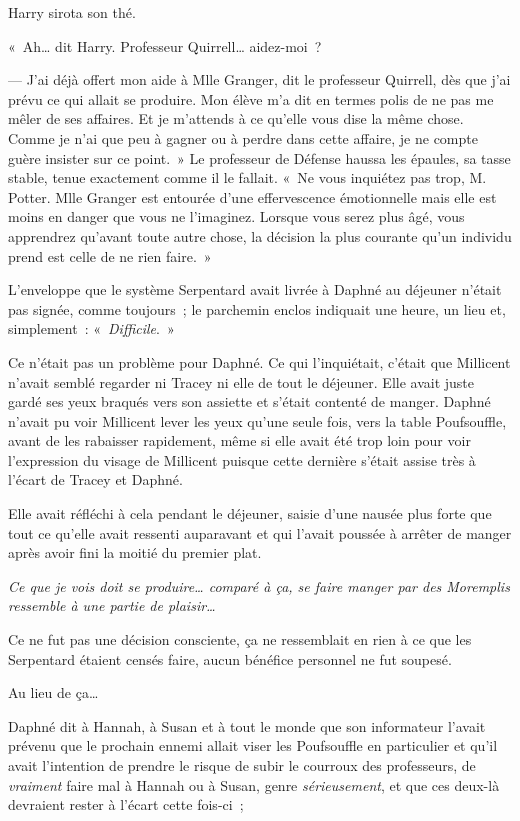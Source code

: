 Harry sirota son thé.

«~Ah… dit Harry. Professeur Quirrell… aidez-moi~?

--- J'ai déjà offert mon aide à Mlle Granger, dit le professeur Quirrell, dès que j'ai prévu ce qui allait se produire. Mon élève m'a dit en termes polis de ne pas me mêler de ses affaires. Et je m'attends à ce qu'elle vous dise la même chose. Comme je n'ai que peu à gagner ou à perdre dans cette affaire, je ne compte guère insister sur ce point.~» Le professeur de Défense haussa les épaules, sa tasse stable, tenue exactement comme il le fallait. «~Ne vous inquiétez pas trop, M. Potter. Mlle Granger est entourée d'une effervescence émotionnelle mais elle est moins en danger que vous ne l'imaginez. Lorsque vous serez plus âgé, vous apprendrez qu'avant toute autre chose, la décision la plus courante qu'un individu prend est celle de ne rien faire.~»

\later

L'enveloppe que le système Serpentard avait livrée à Daphné au déjeuner n'était pas signée, comme toujours~; le parchemin enclos indiquait une heure, un lieu et, simplement~: «~\emph{Difficile}.~»

Ce n'était pas un problème pour Daphné. Ce qui l'inquiétait, c'était que Millicent n'avait semblé regarder ni Tracey ni elle de tout le déjeuner. Elle avait juste gardé ses yeux braqués vers son assiette et s'était contenté de manger. Daphné n'avait pu voir Millicent lever les yeux qu'une seule fois, vers la table Poufsouffle, avant de les rabaisser rapidement, même si elle avait été trop loin pour voir l'expression du visage de Millicent puisque cette dernière s'était assise très à l'écart de Tracey et Daphné.

Elle avait réfléchi à cela pendant le déjeuner, saisie d'une nausée plus forte que tout ce qu'elle avait ressenti auparavant et qui l'avait poussée à arrêter de manger après avoir fini la moitié du premier plat.

\emph{Ce que je vois doit se produire… comparé à ça, se faire manger par des Moremplis ressemble à une partie de plaisir…}

Ce ne fut pas une décision consciente, ça ne ressemblait en rien à ce que les Serpentard étaient censés faire, aucun bénéfice personnel ne fut soupesé.

Au lieu de ça…

Daphné dit à Hannah, à Susan et à tout le monde que son informateur l'avait prévenu que le prochain ennemi allait viser les Poufsouffle en particulier et qu'il avait l'intention de prendre le risque de subir le courroux des professeurs, de \emph{vraiment} faire mal à Hannah ou à Susan, genre \emph{sérieusement}, et que ces deux-là devraient rester à l'écart cette fois-ci~;

